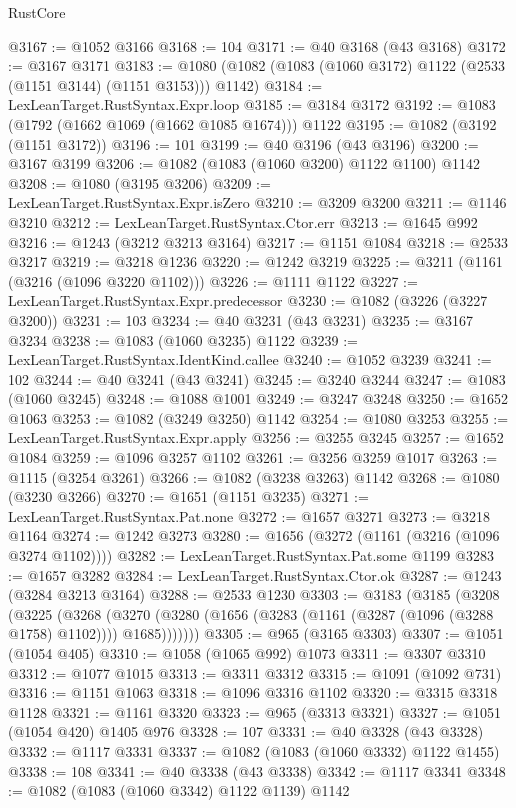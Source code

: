 \begin{lexlean}{RustCore}
\begin{coremodule}
@3167 := @1052 @3166
@3168 := 104
@3171 := @40 @3168 (@43 @3168)
@3172 := @3167 @3171
@3183 := @1080 (@1082 (@1083 (@1060 @3172) @1122 (@2533 (@1151 @3144) (@1151 @3153))) @1142)
@3184 := LexLeanTarget.RustSyntax.Expr.loop
@3185 := @3184 @3172
@3192 := @1083 (@1792 (@1662 @1069 (@1662 @1085 @1674))) @1122
@3195 := @1082 (@3192 (@1151 @3172))
@3196 := 101
@3199 := @40 @3196 (@43 @3196)
@3200 := @3167 @3199
@3206 := @1082 (@1083 (@1060 @3200) @1122 @1100) @1142
@3208 := @1080 (@3195 @3206)
@3209 := LexLeanTarget.RustSyntax.Expr.isZero
@3210 := @3209 @3200
@3211 := @1146 @3210
@3212 := LexLeanTarget.RustSyntax.Ctor.err
@3213 := @1645 @992
@3216 := @1243 (@3212 @3213 @3164)
@3217 := @1151 @1084
@3218 := @2533 @3217
@3219 := @3218 @1236
@3220 := @1242 @3219
@3225 := @3211 (@1161 (@3216 (@1096 @3220 @1102)))
@3226 := @1111 @1122
@3227 := LexLeanTarget.RustSyntax.Expr.predecessor
@3230 := @1082 (@3226 (@3227 @3200))
@3231 := 103
@3234 := @40 @3231 (@43 @3231)
@3235 := @3167 @3234
@3238 := @1083 (@1060 @3235) @1122
@3239 := LexLeanTarget.RustSyntax.IdentKind.callee
@3240 := @1052 @3239
@3241 := 102
@3244 := @40 @3241 (@43 @3241)
@3245 := @3240 @3244
@3247 := @1083 (@1060 @3245)
@3248 := @1088 @1001
@3249 := @3247 @3248
@3250 := @1652 @1063
@3253 := @1082 (@3249 @3250) @1142
@3254 := @1080 @3253
@3255 := LexLeanTarget.RustSyntax.Expr.apply
@3256 := @3255 @3245
@3257 := @1652 @1084
@3259 := @1096 @3257 @1102
@3261 := @3256 @3259 @1017
@3263 := @1115 (@3254 @3261)
@3266 := @1082 (@3238 @3263) @1142
@3268 := @1080 (@3230 @3266)
@3270 := @1651 (@1151 @3235)
@3271 := LexLeanTarget.RustSyntax.Pat.none
@3272 := @1657 @3271
@3273 := @3218 @1164
@3274 := @1242 @3273
@3280 := @1656 (@3272 (@1161 (@3216 (@1096 @3274 @1102))))
@3282 := LexLeanTarget.RustSyntax.Pat.some @1199
@3283 := @1657 @3282
@3284 := LexLeanTarget.RustSyntax.Ctor.ok
@3287 := @1243 (@3284 @3213 @3164)
@3288 := @2533 @1230
@3303 := @3183
    (@3185
      (@3208
        (@3225
          (@3268
            (@3270 (@3280 (@1656 (@3283 (@1161 (@3287 (@1096 (@3288 @1758) @1102)))) @1685)))))))
@3305 := @965 (@3165 @3303)
@3307 := @1051 (@1054 @405)
@3310 := @1058 (@1065 @992) @1073
@3311 := @3307 @3310
@3312 := @1077 @1015
@3313 := @3311 @3312
@3315 := @1091 (@1092 @731)
@3316 := @1151 @1063
@3318 := @1096 @3316 @1102
@3320 := @3315 @3318 @1128
@3321 := @1161 @3320
@3323 := @965 (@3313 @3321)
@3327 := @1051 (@1054 @420) @1405 @976
@3328 := 107
@3331 := @40 @3328 (@43 @3328)
@3332 := @1117 @3331
@3337 := @1082 (@1083 (@1060 @3332) @1122 @1455)
@3338 := 108
@3341 := @40 @3338 (@43 @3338)
@3342 := @1117 @3341
@3348 := @1082 (@1083 (@1060 @3342) @1122 @1139) @1142

\end{coremodule}
\end{lexlean}
